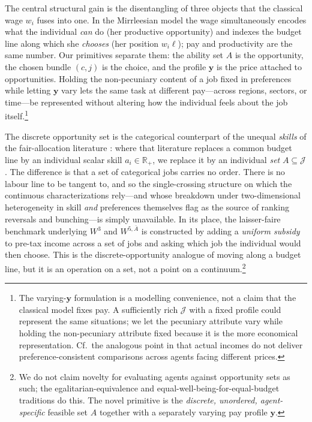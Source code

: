 The central structural gain is the disentangling of three objects that the
classical wage $w_i$ fuses into one. In the Mirrleesian model the wage
simultaneously encodes what the individual \emph{can} do (her productive
opportunity) and indexes the budget line along which she \emph{chooses}
(her position $w_i\ell$); pay and productivity are the same number. Our
primitives separate them: the ability set $A$ is the opportunity, the chosen
bundle $(c,j)$ is the choice, and the profile $\mathbf y$ is the price
attached to opportunities. Holding the non-pecuniary content of a job fixed
in preferences while letting $\mathbf y$ vary lets the same task at different
pay---across regions, sectors, or time---be represented without altering how
the individual feels about the job itself.\footnote{%
The varying-$\mathbf y$ formulation is a modelling convenience, not a claim
that the classical model fixes pay. A sufficiently rich $\mathcal J$ with a
fixed profile could represent the same situations; we let the pecuniary
attribute vary while holding the non-pecuniary attribute fixed because it is
the more economical representation. Cf.\ the analogous point in
\citet{ManiquetMoramarco2026} that actual incomes do not deliver
preference-consistent comparisons across agents facing different prices.}

The discrete opportunity set is the categorical counterpart of the unequal
\emph{skills} of the fair-allocation literature
\cite{FleurbaeyManiquet1996,FleurbaeyManiquet2006}: where that literature
replaces a common budget line by an individual scalar skill $a_i\in\mathbb
R_+$, we replace it by an individual \emph{set} $A\subseteq\mathcal J$. The
difference is that a set of categorical jobs carries no order. There is no
labour line to be tangent to, and so the single-crossing structure on which
the continuous characterizations rely---and whose breakdown under
two-dimensional heterogeneity in skill \emph{and} preferences
\citet{FleurbaeyManiquet2006} themselves flag as the source of ranking
reversals and bunching---is simply unavailable. In its place, the laisser-faire
benchmark underlying $W^3$ and $W^{5,\bar A}$ is constructed by adding a
\emph{uniform subsidy} to pre-tax income across a set of jobs and asking which
job the individual would then choose. This is the discrete-opportunity
analogue of moving along a budget line, but it is an operation on a set, not a
point on a continuum.\footnote{%
We do not claim novelty for evaluating agents against opportunity sets as
such; the egalitarian-equivalence and equal-well-being-for-equal-budget
traditions do this. The novel primitive is the \emph{discrete, unordered,
agent-specific} feasible set $A$ together with a separately varying pay
profile $\mathbf y$.}

